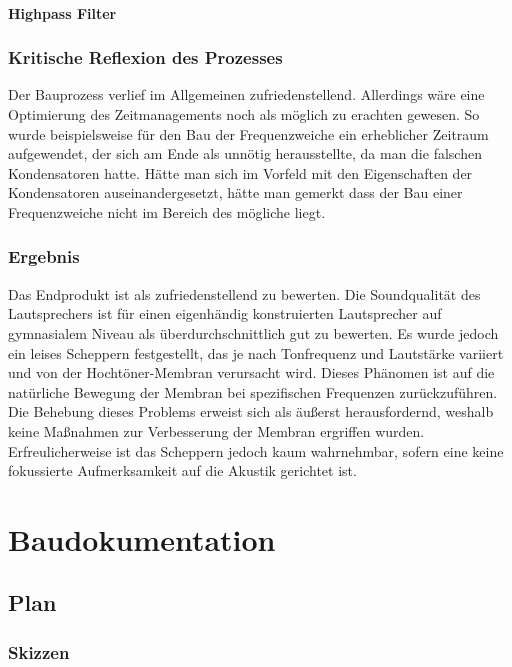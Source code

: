 \documentclass[a4paper,11pt]{report}
\begin{document}
\subsection{Highpass Filter}

\section{Kritische Reflexion des Prozesses}
Der Bauprozess verlief im Allgemeinen zufriedenstellend. Allerdings wäre eine Optimierung des Zeitmanagements noch als möglich zu erachten gewesen. So wurde beispielsweise für den Bau der Frequenzweiche ein erheblicher Zeitraum aufgewendet, der sich am Ende als unnötig herausstellte, da man die falschen Kondensatoren hatte. Hätte man sich im Vorfeld mit den Eigenschaften der Kondensatoren auseinandergesetzt, hätte man gemerkt dass der Bau einer Frequenzweiche nicht im Bereich des mögliche liegt.

\section{Ergebnis}
Das Endprodukt ist als zufriedenstellend zu bewerten. Die Soundqualität des Lautsprechers ist für einen eigenhändig konstruierten Lautsprecher auf gymnasialem Niveau als überdurchschnittlich gut zu bewerten. Es wurde jedoch ein leises Scheppern festgestellt, das je nach Tonfrequenz und Lautstärke variiert und von der Hochtöner-Membran verursacht wird. Dieses Phänomen ist auf die natürliche Bewegung der Membran bei spezifischen Frequenzen zurückzuführen. Die Behebung dieses Problems erweist sich als äußerst herausfordernd, weshalb keine Maßnahmen zur Verbesserung der Membran ergriffen wurden. Erfreulicherweise ist das Scheppern jedoch kaum wahrnehmbar, sofern eine keine fokussierte Aufmerksamkeit auf die Akustik gerichtet ist.


\part{Baudokumentation}

\chapter{Plan}
\section{Skizzen}
\end{document}

